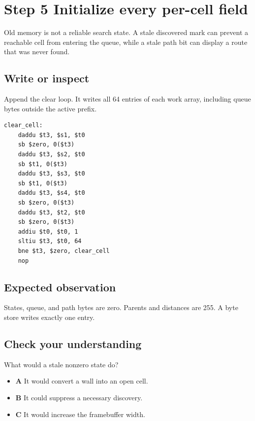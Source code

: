\section{Step 5 Initialize every per-cell field}\label{maze-s05}

Old memory is not a reliable search state. A stale discovered mark can prevent a reachable cell from entering the queue, while a stale path bit can display a route that was never found.

\subsection{Write or inspect}

Append the clear loop. It writes all 64 entries of each work array, including queue bytes outside the active prefix.

\begin{verbatim}
clear_cell:
    daddu $t3, $s1, $t0
    sb $zero, 0($t3)
    daddu $t3, $s2, $t0
    sb $t1, 0($t3)
    daddu $t3, $s3, $t0
    sb $t1, 0($t3)
    daddu $t3, $s4, $t0
    sb $zero, 0($t3)
    daddu $t3, $t2, $t0
    sb $zero, 0($t3)
    addiu $t0, $t0, 1
    sltiu $t3, $t0, 64
    bne $t3, $zero, clear_cell
    nop
\end{verbatim}

\subsection{Expected observation}

States, queue, and path bytes are zero. Parents and distances are 255. A byte store writes exactly one entry.

\subsection{Check your understanding}

What would a stale nonzero state do?

\begin{itemize}
  \item \textbf{A} It would convert a wall into an open cell.
  \item \textbf{B} It could suppress a necessary discovery.
  \item \textbf{C} It would increase the framebuffer width.
\end{itemize}
